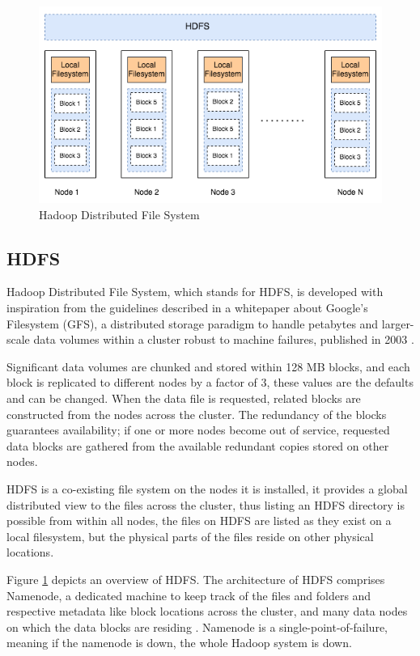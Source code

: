 \documentclass[review]{elsarticle}
\begin{document}
\begin{figure}[h!]
	\caption{Hadoop Distributed File System}
	\label{fig:HDFSoverview}
	\includegraphics[width=\textwidth]{HDFSoverview}
	\centering
\end{figure}

\subsection{HDFS}\label{HDFS}
Hadoop Distributed File System, which stands for HDFS, is developed with inspiration from the guidelines described in a whitepaper about Google's Filesystem (GFS), a distributed storage paradigm to handle petabytes and larger-scale data volumes within a cluster robust to machine failures, published in 2003 \cite{ghemawat_google_2003}. 

Significant data volumes are chunked and stored within 128 MB blocks, and each block is replicated to different nodes by a factor of 3, these values are the defaults and can be changed. When the data file is requested, related blocks are constructed from the nodes across the cluster. The redundancy of the blocks guarantees availability; if one or more nodes become out of service, requested data blocks are gathered from the available redundant copies stored on other nodes. 

HDFS is a co-existing file system on the nodes it is installed, it provides a global distributed view to the files across the cluster, thus listing an HDFS directory is possible from within all nodes, the files on HDFS are listed as they exist on a local filesystem, but the physical parts of the files reside on other physical locations. 

Figure \ref{fig:HDFSoverview} depicts an overview of HDFS. The architecture of HDFS comprises Namenode, a dedicated machine to keep track of the files and folders and respective metadata like block locations across the cluster, and many data nodes on which the data blocks are residing \cite{white_hadoop_2015}. Namenode is a single-point-of-failure, meaning if the namenode is down, the whole Hadoop system is down. 
\end{document}
